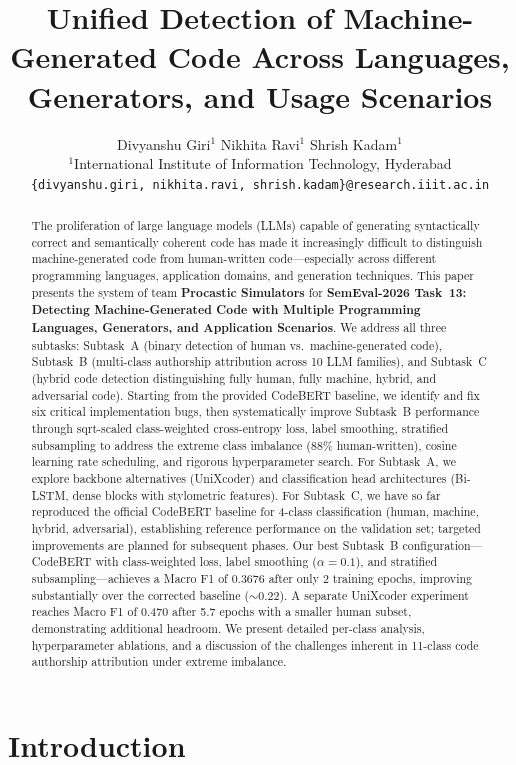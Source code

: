 \documentclass[11pt]{article}
\title{Unified Detection of Machine-Generated
Code Across Languages, Generators, and
Usage Scenarios}
\author{
  Divyanshu Giri$^1$ \quad Nikhita Ravi$^1$ \quad Shrish Kadam$^1$ \\
  $^1$International Institute of Information Technology, Hyderabad \\
  \texttt{\{divyanshu.giri, nikhita.ravi, shrish.kadam\}@research.iiit.ac.in}
}
\begin{document}
\maketitle
\begin{abstract}
The proliferation of large language models (LLMs) capable of generating syntactically correct and semantically coherent code has made it increasingly difficult to distinguish machine-generated code from human-written code---especially across different programming languages, application domains, and generation techniques. This paper presents the system of team \textbf{Procastic Simulators} for \textbf{SemEval-2026 Task~13: Detecting Machine-Generated Code with Multiple Programming Languages, Generators, and Application Scenarios}. We address all three subtasks: Subtask~A (binary detection of human vs.\ machine-generated code), Subtask~B (multi-class authorship attribution across 10 LLM families), and Subtask~C (hybrid code detection distinguishing fully human, fully machine, hybrid, and adversarial code). Starting from the provided CodeBERT baseline, we identify and fix six critical implementation bugs, then systematically improve Subtask~B performance through sqrt-scaled class-weighted cross-entropy loss, label smoothing, stratified subsampling to address the extreme class imbalance (88\% human-written), cosine learning rate scheduling, and rigorous hyperparameter search. For Subtask~A, we explore backbone alternatives (UniXcoder) and classification head architectures (Bi-LSTM, dense blocks with stylometric features). For Subtask~C, we have so far reproduced the official CodeBERT baseline for 4-class classification (human, machine, hybrid, adversarial), establishing reference performance on the validation set; targeted improvements are planned for subsequent phases. Our best Subtask~B configuration---CodeBERT with class-weighted loss, label smoothing ($\alpha{=}0.1$), and stratified subsampling---achieves a Macro F1 of 0.3676 after only 2 training epochs, improving substantially over the corrected baseline ($\sim$0.22). A separate UniXcoder experiment reaches Macro F1 of 0.470 after 5.7 epochs with a smaller human subset, demonstrating additional headroom. We present detailed per-class analysis, hyperparameter ablations, and a discussion of the challenges inherent in 11-class code authorship attribution under extreme imbalance.
\end{abstract}

\section{Introduction}
\label{sec:intro}
\end{document}
